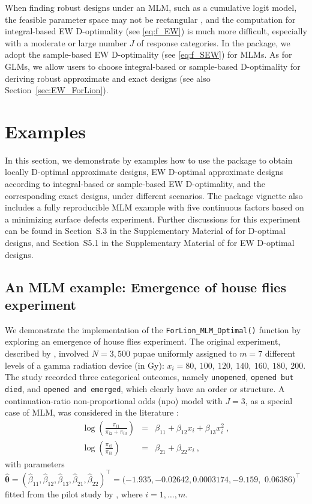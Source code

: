 When finding robust designs under an MLM, such as a cumulative logit model, the feasible parameter space may not be rectangular \citep{bu2020, lin2025ew}, and the computation for integral-based EW D-optimality (see \eqref{eq:f_EW}) is much more difficult,  especially with a moderate or large number $J$ of response categories. In the  package, we adopt the sample-based EW D-optimality (see \eqref{eq:f_SEW}) for MLMs. As for GLMs, we allow users to choose integral-based or sample-based D-optimality for deriving robust approximate and exact designs (see also Section~\ref{sec:EW_ForLion}). 

\section{Examples} \label{sec:example}

In this section, we demonstrate by examples how to use the  package to obtain locally D-optimal approximate designs, EW D-optimal approximate designs according to integral-based or sample-based EW D-optimality, and the corresponding exact designs, under different scenarios. The package vignette also includes a fully reproducible MLM example with five continuous factors based on a minimizing surface defects experiment. Further discussions for this experiment can be found in Section~S.3 in the Supplementary Material of \cite{huang2024forlion} for D-optimal designs, and Section~S5.1 in the Supplementary Material of \cite{lin2025ew} for EW D-optimal designs.

\subsection{An MLM example: Emergence of house flies experiment}\label{sec:fly_example}

We demonstrate the implementation of the \texttt{ForLion\_MLM\_Optimal()} function by exploring an emergence of house flies experiment. The original experiment, described by \cite{itepan1995}, involved $N = 3,500$ pupae uniformly assigned to $m=7$ different levels of a gamma radiation device (in Gy): $x_i = 80, \ 100,\ 120, \ 140, \ 160, \ 180,\  200$. The study recorded three categorical outcomes, namely \texttt{unopened}, \texttt{opened but died}, and \texttt{opened and emerged}, which clearly have an order or structure. A continuation-ratio non-proportional odds (npo) model with $J=3$, as a special case of MLM, was considered in the literature \citep{atkinson1999, bu2020, ai2023locally}:
\begin{eqnarray*}
    \log\left(\frac{\pi_{i1}}{\pi_{i2} + \pi_{i3}}\right) &=& \beta_{11} + \beta_{12} x_i + \beta_{13} x_i^2\ ,\\ 
\log\left(\frac{\pi_{i2}}{\pi_{i3}}\right) &=& \beta_{21} + \beta_{22} x_i\ ,
\end{eqnarray*}
with parameters $\hat{\boldsymbol\theta} = (\hat\beta_{11}, \hat\beta_{12}, \hat\beta_{13}, \hat\beta_{21}, \hat\beta_{22})^\top = (-1.935, -0.02642, 0.0003174,-9.159,$ $0.06386)^\top$ fitted from the pilot study by \cite{itepan1995}, where $i=1, \ldots, m$.

